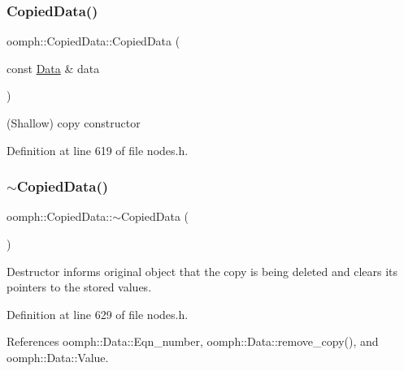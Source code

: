 \mbox{\label{classoomph_1_1CopiedData_a80125e8a22f8de1d26be39fe85a5e207}} 
\subsubsection{\texorpdfstring{Copied\+Data()}{CopiedData()}\hspace{0.1cm}{\footnotesize\ttfamily [2/2]}}
{\footnotesize\ttfamily oomph\+::\+Copied\+Data\+::\+Copied\+Data (\begin{DoxyParamCaption}\item[{const \hyperlink{classoomph_1_1Data}{Data} \&}]{data }\end{DoxyParamCaption})\hspace{0.3cm}{\ttfamily [inline]}}



(Shallow) copy constructor 



Definition at line 619 of file nodes.\+h.

\mbox{\label{classoomph_1_1CopiedData_a3a2a07b9a7c41b687cf32da306cbbb9d}} 
\subsubsection{\texorpdfstring{$\sim$\+Copied\+Data()}{~CopiedData()}}
{\footnotesize\ttfamily oomph\+::\+Copied\+Data\+::$\sim$\+Copied\+Data (\begin{DoxyParamCaption}{ }\end{DoxyParamCaption})\hspace{0.3cm}{\ttfamily [inline]}}



Destructor informs original object that the copy is being deleted and clears its pointers to the stored values. 



Definition at line 629 of file nodes.\+h.



References oomph\+::\+Data\+::\+Eqn\+\_\+number, oomph\+::\+Data\+::remove\+\_\+copy(), and oomph\+::\+Data\+::\+Value.



